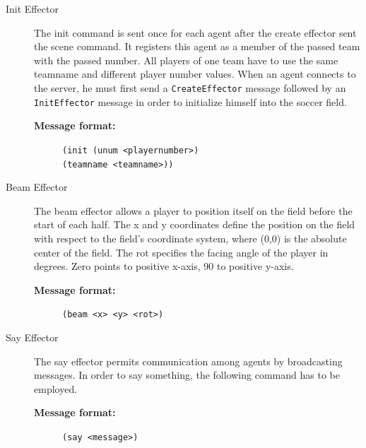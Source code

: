 \begin{description}


  \item [Init Effector]
  The init command is sent once for each agent after the create effector sent the scene command. It registers this agent as a member of the passed team with the passed number. All players of one team have to use the same teamname and different player number values. When an agent connects to the server, he must first send a \texttt{CreateEffector} message followed by an \texttt{InitEffector} message in order to initialize himself into the soccer field.
  \begin{description}
  \item[{\bf Message format:}]  
  \texttt{(init (unum <playernumber>)\\(teamname <teamname>)) }
  \end{description}



  \item [Beam Effector]
  The beam effector allows a player to position itself on the field before the start of each half. The x and y coordinates define the position on the field with respect to the field's coordinate system, where (0,0) is the absolute center of the field. The rot specifies the facing angle of the player in degrees. Zero points to positive x-axis, 90 to positive y-axis.
  \begin{description}
  \item[{\bf Message format:}]  
  \texttt{(beam <x> <y> <rot>)}
  \end{description}



  \item [Say Effector]
  The say effector permits communication among agents by broadcasting messages. In order to say something, the following command has to be employed.
  \begin{description}
  \item[{\bf Message format:}]
  \texttt{(say <message>)}
  \end{description}

\end{description}
